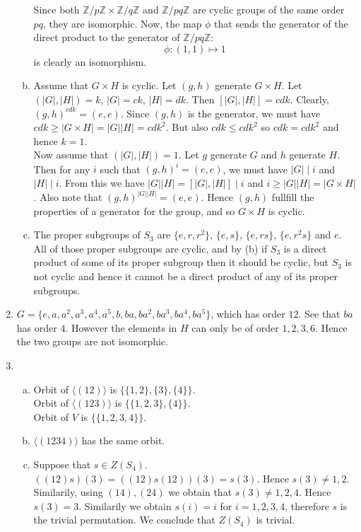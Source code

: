 \documentclass[A4paper,12pt]{article}
\theoremstyle{definition}
\numberwithin{equation}{section}
\begin{document}
\begin{enumerate}[1)]
\begin{enumerate}[(a)]
                Since both $\mathbb{Z}/p\mathbb{Z} \times \mathbb{Z}/q\mathbb{Z}$ and $\mathbb{Z}/pq\mathbb{Z}$ are cyclic groups of the same order $pq$, they are isomorphic.
                Now, the map $\phi$ that sends the generator of the direct product to the generator of $\mathbb{Z}/pq\mathbb{Z}$:
$$\phi: (1, 1) \mapsto 1$$ is clearly an isomorphism.
            \item
                Assume that $G \times H$ is cyclic. Let $(g, h)$ generate $G \times H$. 
                Let $(|G|, |H|) = k$, $|G| = ck$, $|H|=dk$. Then $[|G|, |H|] = cdk$.
                Clearly, $(g, h)^{cdk} = (e, e)$. Since $(g, h)$ is the generator, we must have $cdk \ge |G \times H| = |G||H| = cdk^2$.
                But also $cdk \le cdk^2$ so $cdk = cdk^2$ and hence $k=1$.
                \\
                Now assume that $(|G|,|H|)= 1$. 
                Let $g$ generate $G$ and $h$ generate $H$.
                Then for any $i$ such that $(g, h)^i= (e, e)$, we must have $|G| \mid i$ and $|H| \mid i$.
                From this we have $|G||H| = [|G|, |H|] \mid i$ and $i \ge |G||H| = |G \times H|$. 
                Also note that $(g, h)^{|G||H|} = (e,e)$. Hence $(g, h)$ fullfill the properties of a generator for the group, and so $G \times H$ is cyclic.
            \item
                The proper subgroups of $S_3$ are $\{e, r, r^2\}$, $\{e, s\}$, $\{e, rs\}$, $\{e, r^2s\}$  and ${e}$. All of those proper subgroups are cyclic, and by (b) if $S_3$ is a direct product of some of its proper subgroup then it should be cyclic, but $S_3$ is not cyclic  and hence it cannot be a direct product of any of its proper subgroups.
        \end{enumerate}
    \item
        $G = \{e, a, a^2, a^3, a^4, a^5, b, ba, ba^2, ba^3, ba^4, ba^5\}$, which has order $12$.  
        See that $ba$ has order $4$. However the elements in $H$ can only be of order $1, 2, 3, 6$. Hence the two groups are not isomorphic.
    \item
        \begin{enumerate}[(a)]
            \item
                Orbit of $\langle (12) \rangle$ is $\{\{1, 2\}, \{3\}, \{4\}\}$.\\
                Orbit of $\langle (123) \rangle$ is $\{\{1, 2, 3\}, \{4\}\}$.\\
                Orbit of $V$ is $\{\{1, 2, 3, 4\}\}$.
            \item
                $\langle (1234) \rangle$ has the same orbit.
            \item
                Suppose that $s \in Z(S_4)$. 
                $((12)s) (3) = ((12)s(12)) (3) = s(3)$. 
                Hence $s(3) \neq 1, 2$. Similarily, using $(14), (24)$ we obtain that $s(3) \neq 1, 2, 4$. Hence $s(3) = 3$. 
                Similarily we obtain $s(i) = i$ for $i = 1, 2, 3, 4$, therefore $s$ is the trivial permutation. We conclude that $Z(S_4)$ is trivial.


\end{enumerate}
\end{enumerate}
\end{document}
